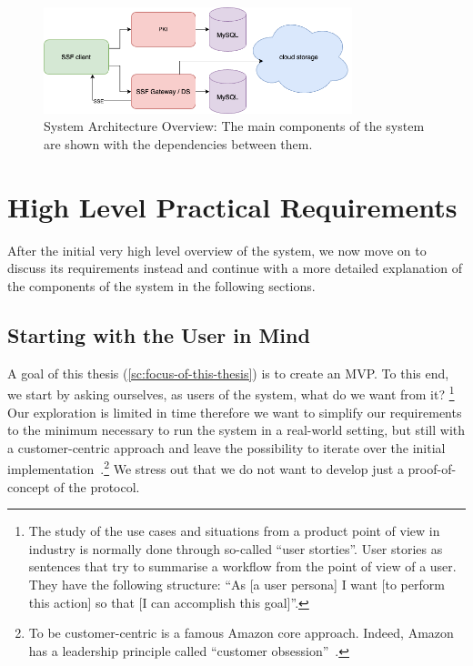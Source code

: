 \begin{figure}
    \centering
    \includegraphics[width=0.8\textwidth]{figures/architecture.png}
    \caption{System Architecture Overview: The main components of the system are shown with the dependencies between them.}
    \label{fig:architecture}
\end{figure}

\section{High Level Practical Requirements}\label{sc:requirements}

After the initial very high level overview of the system, we
now move on to discuss its requirements instead and continue with a more
detailed explanation of the components of the system in the following sections.

\subsection{Starting with the User in Mind}\label{sc:real-user}

A goal of this thesis (\cref{sc:focus-of-this-thesis})
is to create an MVP. To this end, we start by asking ourselves,
as users of the system, what do we want from it?
\footnote{The study of the use cases and situations from a product 
point of view in industry is normally done through so-called ``user storties''.
User stories as sentences that try to summarise a workflow from the
point of view of a user. They have the following structure:
``As [a user persona] I want [to perform this action] so that [I can accomplish this goal]''.}
Our exploration is limited in time therefore we want to simplify
our requirements to the minimum necessary to run the system
in a real-world setting, 
but still with a customer-centric approach
and leave the possibility to iterate over the initial implementation~\cite{ries2011startup}.\footnote{To be customer-centric is a famous Amazon core approach. Indeed, Amazon has a leadership principle called ``customer obsession''~\cite{AmazonLeadershipPrinciples}.}
We stress out that we do not want to develop just a proof-of-concept of the protocol.

